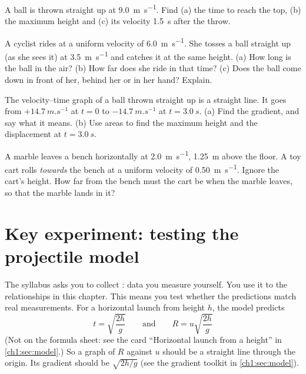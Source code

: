 \begin{quickcheck}
  \item A ball is thrown straight up at \qty{9.0}{m.s^{-1}}. Find (a) the time to reach the top,
        (b) the maximum height and (c) its velocity \qty{1.5}{s} after the throw.
  \item A cyclist rides at a uniform velocity of \qty{6.0}{m.s^{-1}}. She tosses a ball straight
        up (as she sees it) at \qty{3.5}{m.s^{-1}} and catches it at the same height. (a) How
        long is the ball in the air? (b) How far does she ride in that time? (c) Does the ball
        come down in front of her, behind her or in her hand? Explain.
  \item The velocity--time graph of a ball thrown straight up is a straight line. It goes from
        $+\qty{14.7}{m.s^{-1}}$ at $t = 0$ to $-\qty{14.7}{m.s^{-1}}$ at $t = \qty{3.0}{s}$. (a) Find
        the gradient, and say what it means. (b) Use areas to find the maximum height and the
        displacement at $t = \qty{3.0}{s}$.
  \item A marble leaves a bench horizontally at \qty{2.0}{m.s^{-1}}, \qty{1.25}{m} above the
        floor. A toy cart rolls \emph{towards} the bench at a uniform velocity of
        \qty{0.50}{m.s^{-1}}. Ignore the cart's height. How far from the bench must the cart be
        when the marble leaves, so that the marble lands in it?
\end{quickcheck}

\section{Key experiment: testing the projectile model}\label{ch1:sec:experiments}

\begin{keywords}
\end{keywords}

The syllabus asks you to collect : data you measure yourself. You use it to
 the relationships in this chapter. This means you test whether the predictions
match real measurements. For a horizontal launch from height $h$, the model predicts
\begin{equation}
  t = \sqrt{\frac{2h}{g}} \qquad\text{and}\qquad R = u\sqrt{\frac{2h}{g}}
  \label{ch1:eq:benchrange}
\end{equation}
(Not on the formula sheet: see the card ``Horizontal launch from a height'' in
\cref{ch1:sec:model}.) So a graph of $R$ against $u$ should be a straight line through the
origin. Its gradient should be $\sqrt{2h/g}$ (see the gradient toolkit in \cref{ch1:sec:model}).

